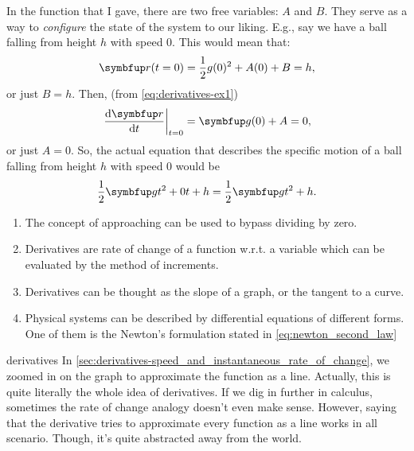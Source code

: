 In the function that I gave, there are two free variables: \(A\) and \(B\). They serve as a way to \emph{configure} the state of the system to our liking. E.g., say we have a ball falling from height \(h\) with speed \(0\). This would mean that:
\begin{equation}
  \vv{r}(t = 0) = \frac{1}{2}g(0)^2 + A(0) + B = h,
\end{equation}
or just \(B = h\). Then, (from \cref{eq:derivatives-ex1})
\begin{align}
  \odv{\vv{r}}{t}_{t = 0} = \vv{g}(0) + A = 0,
\end{align}
or just \(A = 0\). So, the actual equation that describes the specific motion of a ball falling from height \(h\) with speed \(0\) would be
\begin{equation}
  \frac{1}{2}\vv{g}t^2 + 0t + h = \frac{1}{2}\vv{g}t^2 + h.
\end{equation}

\conclusion

\begin{enumerate}[noitemsep]
  \item The concept of approaching can be used to bypass dividing by zero.
  \item Derivatives are rate of change of a function w.r.t. a variable which can be evaluated by the method of increments.
  \item Derivatives can be thought as the slope of a graph, or the tangent to a curve.
  \item Physical systems can be described by differential equations of different forms. One of them is the Newton's formulation stated in \cref{eq:newton_second_law}
\end{enumerate}

\begin{remark}{}{derivatives}
  In \cref{sec:derivatives-speed_and_instantaneous_rate_of_change}, we zoomed in on the graph to approximate the function as a line. Actually, this is quite literally the whole idea of derivatives. If we dig in further in calculus, sometimes the rate of change analogy doesn't even make sense. However, saying that the derivative tries to approximate every function as a line works in all scenario. Though, it's quite abstracted away from the world.
\end{remark}
